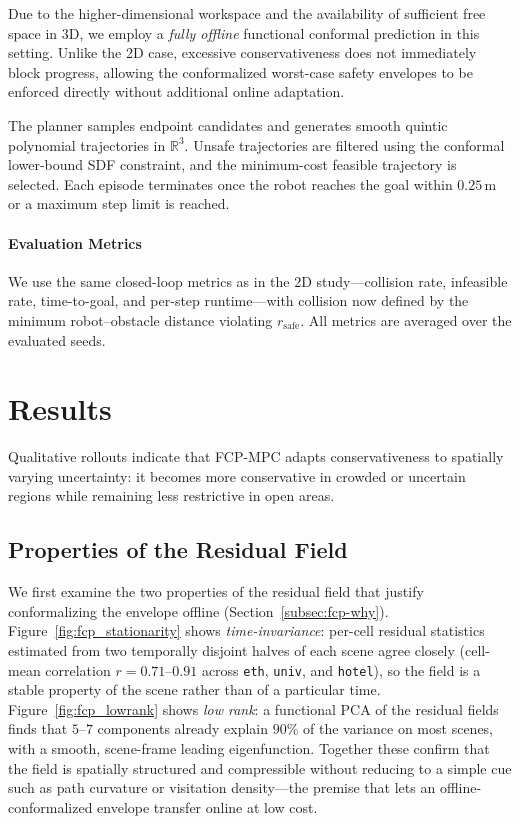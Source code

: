 \documentclass[lettersize,journal]{IEEEtran}
\begin{document}
Due to the higher-dimensional workspace and the availability of sufficient
free space in 3D, we employ a \emph{fully offline} functional conformal
prediction in this setting.
Unlike the 2D case, excessive conservativeness does not immediately block
progress, allowing the conformalized worst-case safety envelopes to be enforced
directly without additional online adaptation.

The planner samples endpoint candidates and generates smooth quintic polynomial
trajectories in $\mathbb{R}^3$.
Unsafe trajectories are filtered using the conformal lower-bound SDF constraint,
and the minimum-cost feasible trajectory is selected.
Each episode terminates once the robot reaches the goal within
$0.25\,\mathrm{m}$ or a maximum step limit is reached.


\paragraph{Evaluation Metrics}
We use the same closed-loop metrics as in the 2D study---collision rate, infeasible
rate, time-to-goal, and per-step runtime---with collision now defined by the minimum
robot--obstacle distance violating $r_{\mathrm{safe}}$. All metrics are averaged over the
evaluated seeds.



\section{Results}\label{sec:res}
Qualitative rollouts indicate that FCP-MPC adapts conservativeness to spatially
varying uncertainty: it becomes more conservative in crowded or uncertain regions
while remaining less restrictive in open areas.

\subsection{Properties of the Residual Field}
\label{sec:res-properties}
We first examine the two properties of the residual field that justify conformalizing
the envelope offline (Section~\ref{subsec:fcp-why}).
Figure~\ref{fig:fcp_stationarity} shows \emph{time-invariance}: per-cell residual
statistics estimated from two temporally disjoint halves of each scene agree closely
(cell-mean correlation $r=0.71$--$0.91$ across \texttt{eth}, \texttt{univ}, and
\texttt{hotel}), so the field is a stable property of the scene rather than of a
particular time.
Figure~\ref{fig:fcp_lowrank} shows \emph{low rank}: a functional PCA of the residual
fields finds that $5$--$7$ components already explain $90\%$ of the variance on most
scenes, with a smooth, scene-frame leading eigenfunction.
Together these confirm that the field is spatially structured and compressible without
reducing to a simple cue such as path curvature or visitation density---the premise
that lets an offline-conformalized envelope transfer online at low cost.
\end{document}
